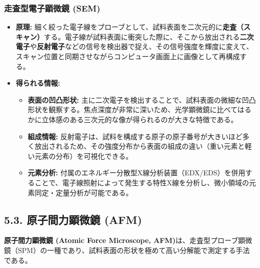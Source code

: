 \documentclass[11pt,a4paper]{ltjsarticle}
\begin{document}
\subsubsection*{走査型電子顕微鏡 (SEM)}
\begin{itemize}
\item \textbf{原理:} 細く絞った電子線をプローブとして、試料表面を二次元的に\textbf{走査（スキャン）}する。電子線が試料表面に衝突した際に、そこから放出される\textbf{二次電子}や\textbf{反射電子}などの信号を検出器で捉え、その信号強度を輝度に変えて、スキャン位置と同期させながらコンピュータ画面上に画像として再構成する。
\item \textbf{得られる情報:}
\begin{itemize}
\item \textbf{表面の凹凸形状:} 主に二次電子を検出することで、試料表面の微細な凹凸形状を観察する。焦点深度が非常に深いため、光学顕微鏡に比べてはるかに立体感のある三次元的な像が得られるのが大きな特徴である。
\item \textbf{組成情報:} 反射電子は、試料を構成する原子の原子番号が大きいほど多く放出されるため、その強度分布から表面の組成の違い（重い元素と軽い元素の分布）を可視化できる。
\item \textbf{元素分析:} 付属のエネルギー分散型X線分析装置（EDX/EDS）を併用することで、電子線照射によって発生する特性X線を分析し、微小領域の元素同定・定量分析が可能である。
\end{itemize}
\end{itemize}

\subsection*{5.3. 原子間力顕微鏡 (AFM)}

\textbf{原子間力顕微鏡 (Atomic Force Microscope, AFM)}は、走査型プローブ顕微鏡（SPM）の一種であり、試料表面の形状を極めて高い分解能で測定する手法である。
\end{document}
